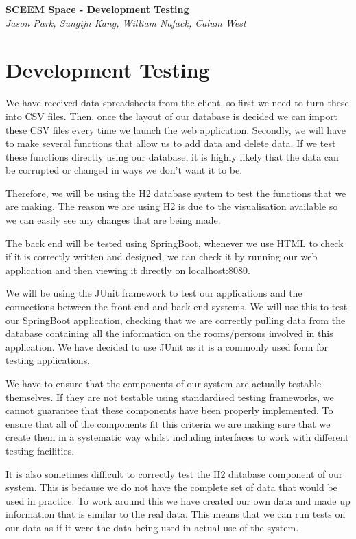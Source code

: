 \documentclass[11pt,a4paper]{article}
\begin{document}
\begin{titlepage}
   \begin{center}
      \Large\textbf{SCEEM Space - Development Testing}\\
      \large\textit{Jason Park, Sungijn Kang, William Nafack, Calum West}
   \end{center}
\end{titlepage}

\section{Development Testing}
We have received data spreadsheets from the client, so first we need to turn these into CSV files. Then, once the layout of our database is decided we can import these CSV files every time we launch the web application. Secondly, we will have to make several functions that allow us to add data and delete data. If we test these functions directly using our database, it is highly likely that the data can be corrupted or changed in ways we don’t want it to be.
\bigskip

Therefore, we will be using the H2 database system to test the functions that we are making. The reason we are using H2 is due to the visualisation available so we can easily see any changes that are being made.
\bigskip

The back end will be tested using SpringBoot, whenever we use HTML to check if it is correctly written and designed, we can check it by running our web application and then viewing it directly on localhost:8080.
\bigskip

We will be using the JUnit framework to test our applications and the connections between the front end and back end systems. We will use this to test our SpringBoot application, checking that we are correctly pulling data from the database containing all the information on the rooms/persons involved in this application. We have decided to use JUnit as it is a commonly used form for testing applications.
\bigskip

We have to ensure that the components of our system are actually testable themselves. If they are not testable using standardised testing frameworks, we cannot guarantee that these components have been properly implemented. To ensure that all of the components fit this criteria we are making sure that we create them in a systematic way whilst including interfaces to work with different testing facilities.
\bigskip

It is also sometimes difficult to correctly test the H2 database component of our system. This is because we do not have the complete set of data that would be used in practice. To work around this we have created our own data and made up information that is similar to the real data. This means that we can run tests on our data as if it were the data being used in actual use of the system.
\bigskip
\end{document}
